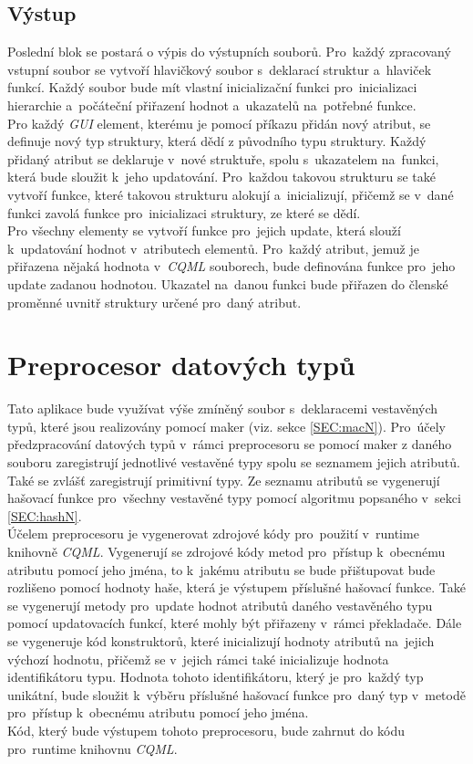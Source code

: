 \documentclass[11pt,twoside,a4paper]{book}
\begin{document}
\subsection{Výstup}
Poslední blok se postará o výpis do výstupních souborů. Pro~každý zpracovaný vstupní soubor se vytvoří hlavičkový soubor s~deklarací struktur a~hlaviček funkcí. Každý soubor bude mít vlastní inicializační funkci pro~inicializaci hierarchie a~počáteční přiřazení hodnot a~ukazatelů na~potřebné funkce.\\
Pro každý \textit{GUI} element, kterému je pomocí příkazu přidán nový atribut, se definuje nový typ struktury, která dědí z původního typu struktury. Každý přidaný atribut se deklaruje v~nové struktuře, spolu s~ukazatelem na~funkci, která bude sloužit k~jeho updatování. Pro~každou takovou strukturu se také vytvoří funkce, které takovou strukturu alokují a~inicializují, přičemž se v~dané funkci zavolá funkce pro~inicializaci struktury, ze které se dědí.\\
Pro všechny elementy se vytvoří funkce pro~jejich update, která slouží k~updatování hodnot v~atributech elementů. Pro~každý atribut, jemuž je přiřazena nějaká hodnota v~\textit{CQML} souborech, bude definována funkce pro~jeho update zadanou hodnotou. Ukazatel na~danou funkci bude přiřazen do členské proměnné uvnitř struktury určené pro~daný atribut.\\  %


\section{\label{SEC:prepN}Preprocesor datových typů}
Tato aplikace bude využívat výše zmíněný soubor s~deklaracemi vestavěných typů, které jsou realizovány pomocí maker (viz. sekce \ref{SEC:macN}). Pro~účely předzpracování datových typů v~rámci preprocesoru se pomocí maker z daného souboru zaregistrují jednotlivé vestavěné typy spolu se seznamem jejich atributů. Také se zvlášť zaregistrují primitivní typy. Ze seznamu atributů se vygenerují hašovací funkce pro~všechny vestavěné typy pomocí algoritmu popsaného v~sekci \ref{SEC:hashN}.\\
Účelem preprocesoru je vygenerovat zdrojové kódy pro~použití v~runtime knihovně \textit{CQML}. Vygenerují se zdrojové kódy metod pro~přístup k~obecnému atributu pomocí jeho jména, to k~jakému atributu se bude přištupovat bude rozlišeno pomocí hodnoty haše, která je výstupem příslušné hašovací funkce. Také se vygenerují metody pro~update hodnot atributů daného vestavěného typu pomocí updatovacích funkcí, které mohly být přiřazeny v~rámci překladače. Dále se vygeneruje kód konstruktorů, které inicializují hodnoty atributů na~jejich výchozí hodnotu, přičemž se v~jejich rámci také inicializuje hodnota identifikátoru typu. Hodnota tohoto identifikátoru, který je pro~každý typ unikátní, bude sloužit k~výběru příslušné hašovací funkce pro~daný typ v~metodě pro~přístup k~obecnému atributu pomocí jeho jména.\\
Kód, který bude výstupem tohoto preprocesoru, bude zahrnut do kódu pro~runtime knihovnu \textit{CQML}.\\
\end{document}
